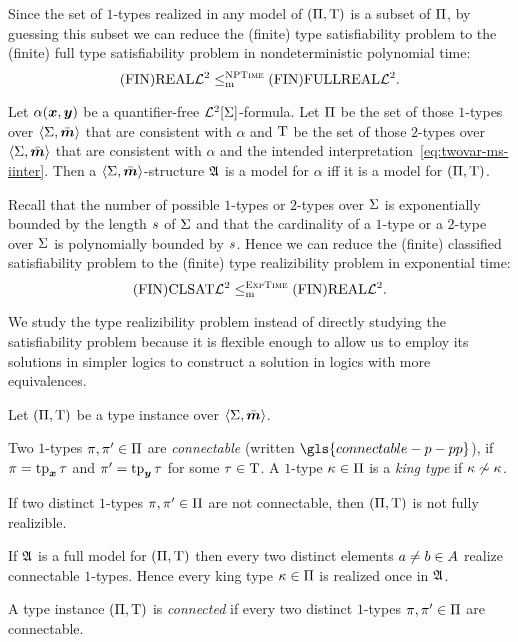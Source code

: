 \begin{remark}\label{rem:red-real-to-full-real}
Since the set of $1$-types realized in any model of $(\Pi,\mathrm{T})$ is a subset
of $\Pi$, by guessing this subset we can reduce the (finite) type
satisfiability problem to the (finite) full type satisfiability problem in
nondeterministic polynomial time:
\[
  \mathrm{(FIN)REAL}\mathcal{L}^{2} \leq_{\mathrm{m}}^{\text{\normalfont{\scshape NPTime}}} \mathrm{(FIN)FULLREAL}\mathcal{L}^{2}.
\]
\end{remark}

\begin{remark}\label{rem:red-sat-to-real}
Let $\alpha(\bm{x},\bm{y})$ be a quantifier-free $\mathcal{L}^{2}[\mathrm{\Sigma}]$-formula. Let $\Pi$ be
the set of those $1$-types over $\left\langle \mathrm{\Sigma},\bar{\bm{m}} \right\rangle$ that are consistent with
$\alpha$ and $\mathrm{T}$ be the set of those $2$-types over $\left\langle \mathrm{\Sigma},\bar{\bm{m}} \right\rangle$ that
are consistent with $\alpha$ and the intended
interpretation~\cref{eq:twovar-ms-iinter}. Then a $\left\langle \mathrm{\Sigma},\bar{\bm{m}} \right\rangle$-structure
$\mathfrak{A}$ is a model for $\alpha$ iff it is a model for $(\Pi,\mathrm{T})$.

Recall that the number of possible $1$-types or $2$-types over $\mathrm{\Sigma}$ is
exponentially bounded by the length $s$ of $\mathrm{\Sigma}$ and that the cardinality
of a $1$-type or a $2$-type over $\mathrm{\Sigma}$ is polynomially bounded by $s$.
Hence we can reduce the (finite) classified satisfiability problem to the
(finite) type realizibility problem in exponential time:
\[
  \mathrm{(FIN)CLSAT}\mathcal{L}^{2} \leq_{\mathrm{m}}^{\text{\normalfont{\scshape ExpTime}}} \mathrm{(FIN)REAL}\mathcal{L}^{2}.
\]
\end{remark}

We study the type realizibility problem instead of directly studying the
satisfiability problem because it is flexible enough to allow us to employ its
solutions in simpler logics to construct a solution in logics with more
equivalences.

Let $(\Pi,\mathrm{T})$ be a type instance over $\left\langle \mathrm{\Sigma},\bar{\bm{m}} \right\rangle$.
\begin{definition}
Two $1$-types $\pi, {\pi'} \in \Pi$ are \emph{connectable} (written
$\gls{connectable-p-pp}$), if $\pi = \operatorname{tp}_{\bm{x}}\tau$ and ${\pi'} = \operatorname{tp}_{\bm{y}}\tau$ for
some $\tau \in \mathrm{T}$. A $1$-type $\kappa \in \Pi$ is a \emph{king type} if
$\kappa \not\sim \kappa$.
\end{definition}
\begin{remark}\label{rem:twovar-king-once}
If two distinct $1$-types $\pi, {\pi'} \in \Pi$ are not connectable, then
$(\Pi,\mathrm{T})$ is not fully realizible.

If $\mathfrak{A}$ is a full model for $(\Pi,\mathrm{T})$ then every two distinct elements
$a \neq b \in A$ realize connectable $1$-types. Hence every king type
$\kappa \in \Pi$ is realized once in $\mathfrak{A}$.

A type instance $(\Pi,\mathrm{T})$ is \emph{connected} if every two distinct
$1$-types $\pi, {\pi'} \in \Pi$ are connectable.
\end{remark}

